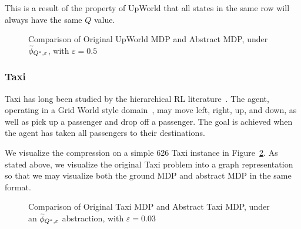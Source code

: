 This is a result of the property of UpWorld that all states in the same row will always have the same $Q$ value.
\begin{figure}[h]
\centering
{}
\hspace{6mm}
\label{fig:upworld-visual}
\caption{Comparison of Original UpWorld MDP and Abstract MDP, under $\widetilde \phi_{Q^*,\varepsilon}$, with $\varepsilon=0.5$}
\end{figure} 

\subsubsection{Taxi}

Taxi has long been studied by the hierarchical RL literature~\cite{dietterich2000hierarchical}. The agent, operating in a Grid World style domain~\cite{russell1995modern}, may move left, right, up, and down, as well as pick up a passenger and drop off a passenger. The goal is achieved when the agent has taken all passengers to their destinations.

We visualize the compression on a simple 626 Taxi instance in Figure~\ref{fig:taxi-visual}. As stated above, we visualize the original Taxi problem into a graph representation so that we may visualize both the ground MDP and abstract MDP in the same format.

\begin{figure}[h]
\centering
{}
\hspace{6mm}
\label{fig:taxi-visual}
\caption{Comparison of Original Taxi MDP and Abstract Taxi MDP, under an $\widetilde \phi_{Q^*,\varepsilon}$ abstraction, with $\varepsilon=0.03$}
\end{figure} 




